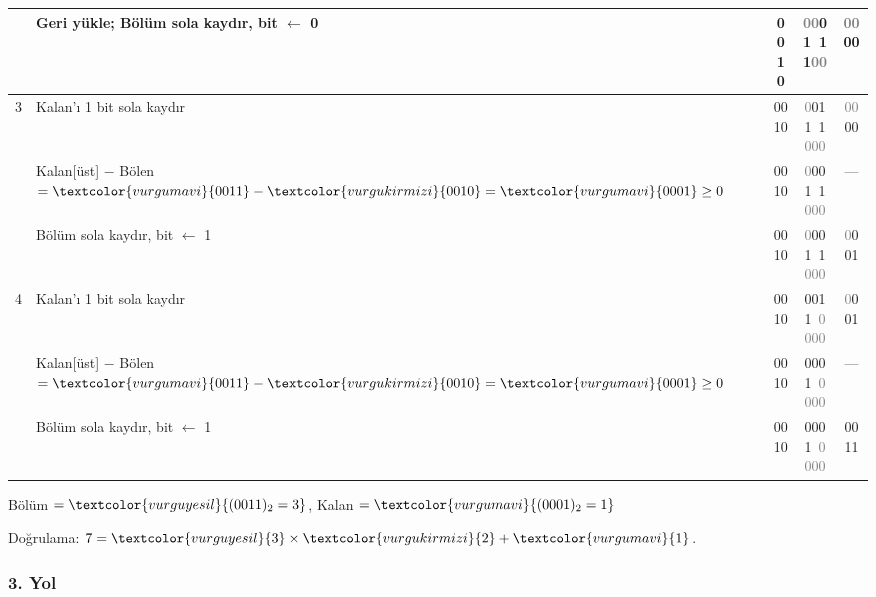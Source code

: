 \begin{ornek}[5.11]
\begin{center}
{\begin{tabular}{c l c c c}
  & Geri yükle; Bölüm sola kaydır, bit $\leftarrow$ 0 & \textcolor{vurgukirmizi}{0010} & \textcolor{gray}{00}\textcolor{vurgumavi}{01}\ \textcolor{vurguturuncu}{11}\textcolor{gray}{00} & \textcolor{gray}{00}\textcolor{vurguyesil}{00} \\
\midrule
3 & Kalan'ı 1 bit sola kaydır & \textcolor{vurgukirmizi}{0010} & \textcolor{gray}{0}\textcolor{vurgumavi}{011}\ \textcolor{vurguturuncu}{1}\textcolor{gray}{000} & \textcolor{gray}{00}\textcolor{vurguyesil}{00} \\
  & Kalan[üst] $-$ Bölen $= \textcolor{vurgumavi}{0011} - \textcolor{vurgukirmizi}{0010} = \textcolor{vurgumavi}{0001} \geq 0$ & \textcolor{vurgukirmizi}{0010} & \textcolor{gray}{0}\textcolor{vurgumavi}{001}\ \textcolor{vurguturuncu}{1}\textcolor{gray}{000} & --- \\
  & Bölüm sola kaydır, bit $\leftarrow$ 1 & \textcolor{vurgukirmizi}{0010} & \textcolor{gray}{0}\textcolor{vurgumavi}{001}\ \textcolor{vurguturuncu}{1}\textcolor{gray}{000} & \textcolor{gray}{0}\textcolor{vurguyesil}{001} \\
\midrule
4 & Kalan'ı 1 bit sola kaydır & \textcolor{vurgukirmizi}{0010} & \textcolor{vurgumavi}{0011}\ \textcolor{gray}{0000} & \textcolor{gray}{0}\textcolor{vurguyesil}{001} \\
  & Kalan[üst] $-$ Bölen $= \textcolor{vurgumavi}{0011} - \textcolor{vurgukirmizi}{0010} = \textcolor{vurgumavi}{0001} \geq 0$ & \textcolor{vurgukirmizi}{0010} & \textcolor{vurgumavi}{0001}\ \textcolor{gray}{0000} & --- \\
  & Bölüm sola kaydır, bit $\leftarrow$ 1 & \textcolor{vurgukirmizi}{0010} & \textcolor{vurgumavi}{0001}\ \textcolor{gray}{0000} & \textcolor{vurguyesil}{0011} \\
\bottomrule
\end{tabular}}%
\end{center}

Bölüm $= \textcolor{vurguyesil}{(0011)_2 = 3}$, \quad Kalan $= \textcolor{vurgumavi}{(0001)_2 = 1}$

Doğrulama: $7 = \textcolor{vurguyesil}{3} \times \textcolor{vurgukirmizi}{2} + \textcolor{vurgumavi}{1}$. \checkmark
\end{ornek}

\subsubsection{3. Yol}

